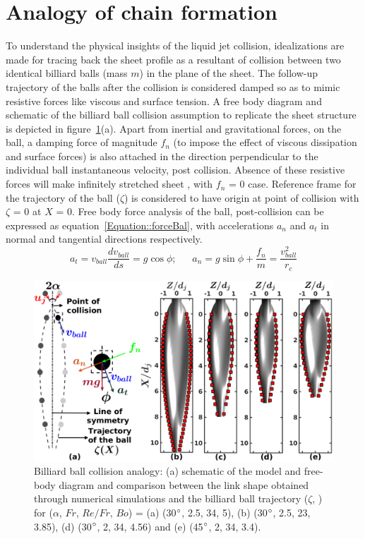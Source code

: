 \documentclass{jfm}
\begin{document}
\section{Analogy of chain formation}	
To understand the physical insights of the liquid jet collision, idealizations are made for tracing back the sheet profile as a resultant of collision between two identical billiard balls (mass $m$) in the plane of the sheet. The follow-up trajectory of the balls after the collision is considered damped so as to mimic resistive forces like viscous and surface tension. A free body diagram and schematic of the billiard ball collision assumption to replicate the sheet structure is depicted in figure~\ref{Figure::analytical}(a). Apart from inertial and gravitational forces, on the ball, a damping force of magnitude $f_n$ (to impose the effect of viscous dissipation and surface forces) is also attached in the direction perpendicular to the individual ball instantaneous velocity, post collision. Absence of these resistive forces will make infinitely stretched sheet \citep{taylor1960formation}, with $f_n$ = 0 case. Reference frame for the trajectory of the ball ($\zeta$) is considered to have origin at point of collision with $\zeta$ = 0 at $X$ = 0. Free body force analysis of the ball, post-collision can be expressed as equation~\ref{Equation::forceBal}, with accelerations $a_n$ and $a_t$ in normal and tangential directions respectively.
\begin{equation}
	\label{Equation::forceBal}	
	a_t = v_{ball}\frac{dv_{ball}}{ds} = g\cos\phi;\:\:\:\:\:\:\:
	a_n = g\sin\phi + \frac{f_n}{m} = \frac{v_{ball}^2}{r_c}
\end{equation}
\begin{figure}%
	\centering
	\includegraphics[width=0.675\linewidth]{Figure6}
	\caption{Billiard ball collision analogy: (a) schematic of the model and free-body diagram and comparison between the link shape obtained through numerical simulations and the billiard ball trajectory ($\zeta$, \protect\MarkerSquareRed) for ($\alpha$, $Fr$, $Re/Fr$, $Bo$) = (a) (30$\degree$, 2.5, 34, 5), (b) (30$\degree$, 2.5, 23, 3.85), (d) (30$\degree$, 2, 34, 4.56) and (e) (45$\degree$, 2, 34, 3.4).}
	\label{Figure::analytical}
\end{figure}%
\end{document}
